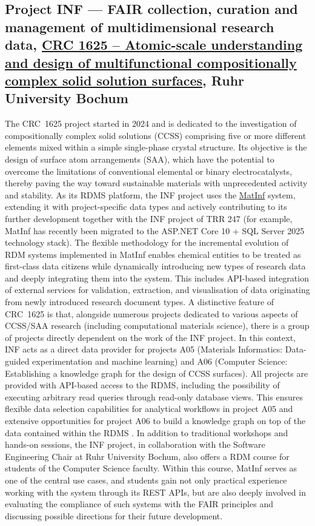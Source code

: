 \documentclass{eceasst}
\begin{document}
\subsection{Project INF --- FAIR collection, curation and management of multidimensional research data, \href{https://gepris.dfg.de/gepris/projekt/506711657?language=en}{CRC 1625 – Atomic-scale understanding and design of multifunctional compositionally complex solid solution surfaces}, Ruhr University Bochum}
The CRC~1625 project started in 2024 and is dedicated to the investigation of compositionally complex solid solutions (CCSS) comprising five or more different elements mixed within a simple single-phase crystal structure.
Its objective is the design of surface atom arrangements (SAA), which have the potential to overcome the limitations of conventional elemental or binary electrocatalysts, thereby paving the way toward sustainable materials with unprecedented activity and stability.
As its RDMS platform, the INF project uses the \href{https://matinf.pro/}{MatInf} system, extending it with project-specific data types and actively contributing to its further development together with the INF project of TRR 247 (for example, MatInf has recently been migrated to the ASP.NET Core 10 + SQL Server 2025 technology stack).
The flexible methodology for the incremental evolution of RDM systems implemented in MatInf \cite{Dudarev2026} enables chemical entities to be treated as first-class data citizens while dynamically introducing new types of research data and deeply integrating them into the system.
This includes API-based integration of external services for validation, extraction, and visualisation of data originating from newly introduced research document types.
A distinctive feature of CRC~1625 is that, alongside numerous projects dedicated to various aspects of CCSS/SAA research (including computational materials science), there is a group of projects directly dependent on the work of the INF project.
In this context, INF acts as a direct data provider for projects A05 (Materials Informatics: Data-guided experimentation and machine learning) and A06 (Computer Science: Establishing a knowledge graph for the design of CCSS surfaces).
All projects are provided with API-based access to the RDMS, including the possibility of executing arbitrary read queries through read-only database views.
This ensures flexible data selection capabilities for analytical workflows in project A05 and extensive opportunities for project A06 to build a knowledge graph on top of the data contained within the RDMS \cite{Mohamed2026}.
In addition to traditional workshops and hands-on sessions, the INF project, in collaboration with the Software Engineering Chair at Ruhr University Bochum, also offers a RDM course for students of the Computer Science faculty.
Within this course, MatInf serves as one of the central use cases, and students gain not only practical experience working with the system through its REST APIs, but are also deeply involved in evaluating the compliance of such systems with the FAIR principles and discussing possible directions for their future development.
\end{document}
